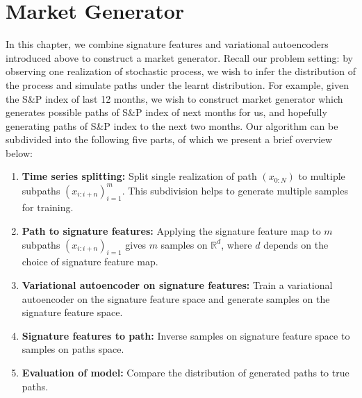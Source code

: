 \documentclass[12pt]{report}
\theoremstyle{definition}
\theoremstyle{remark}
\newcommand{\R}{\mathbb{R}}
\begin{document}
\chapter{Market Generator}\label{marketgenerator}
In this chapter, we combine signature features and variational autoencoders introduced above to construct a market generator. Recall our problem setting: by observing one realization of stochastic process, we wish to infer the distribution of the process and simulate paths under the learnt distribution. For example, given the S\&P index of last 12 months, we wish to construct market generator which generates possible paths of S\&P index of next months for us, and hopefully generating paths of S\&P index to the next two months. Our algorithm can be subdivided into the following five parts, of which we present a brief overview below:
\begin{enumerate}[start=1,label={( Step \arabic*):}]
  \item \textbf{Time series splitting:} Split single realization of path $(x_{0:N})$ to multiple subpaths $(x_{i:i+n})_{i=1}^{m}$. This subdivision helps to generate multiple samples for training. 
  \item \textbf{Path to signature features:} Applying the signature feature map to $m$ subpaths $(x_{i:i+n})_{i=1}$ gives $m$ samples on $\R^{d}$, where $d$ depends on the choice of signature feature map.   
  \item \textbf{Variational autoencoder on signature features: } Train a variational autoencoder on the signature feature space and generate samples on the signature feature space.  
  \item \textbf{Signature features to path:} Inverse samples on signature feature space to samples on paths space. 
  \item \textbf{Evaluation of model:} Compare the distribution of generated paths to true paths. 
\end{enumerate}
\end{document}
